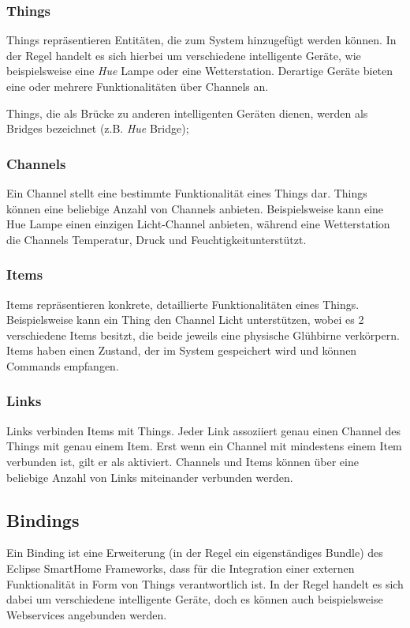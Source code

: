 \subsubsection{Things}
Things repräsentieren Entitäten, die zum System hinzugefügt werden können. In der Regel handelt es sich hierbei um verschiedene intelligente Geräte, wie beispielsweise eine \textit{Hue} Lampe oder eine Wetterstation. Derartige Geräte bieten eine oder mehrere Funktionalitäten über Channels an.

Things, die als Brücke zu anderen intelligenten Geräten dienen, werden als Bridges bezeichnet (z.B. \textit{Hue} Bridge);

\subsubsection{Channels}
Ein Channel stellt eine bestimmte Funktionalität eines Things dar. Things können eine beliebige Anzahl von Channels anbieten. Beispielsweise kann eine Hue Lampe einen einzigen \glqq Licht\grqq -Channel anbieten, während eine Wetterstation die Channels \glqq Temperatur\grqq , \glqq Druck\grqq{} und \glqq Feuchtigkeit\grqq unterstützt.

\subsubsection{Items}
Items repräsentieren konkrete, detaillierte Funktionalitäten eines Things. Beispielsweise kann ein Thing den Channel \glqq Licht\grqq{} unterstützen, wobei es 2 verschiedene Items besitzt, die beide jeweils eine physische Glühbirne verkörpern. Items haben einen Zustand, der im System gespeichert wird und können Commands empfangen.

\subsubsection{Links}
Links verbinden Items mit Things. Jeder Link assoziiert genau einen Channel des Things mit genau einem Item. Erst wenn ein Channel mit mindestens einem Item verbunden ist, gilt er als \glqq aktiviert\grqq{}. Channels und Items können über eine beliebige Anzahl von Links miteinander verbunden werden.


\subsection{Bindings}
Ein Binding ist eine Erweiterung (in der Regel ein eigenständiges Bundle) des Eclipse SmartHome Frameworks, dass für die Integration einer externen Funktionalität in Form von Things verantwortlich ist. 
In der Regel handelt es sich dabei um verschiedene intelligente Geräte, doch es können auch beispielsweise Webservices angebunden werden.

